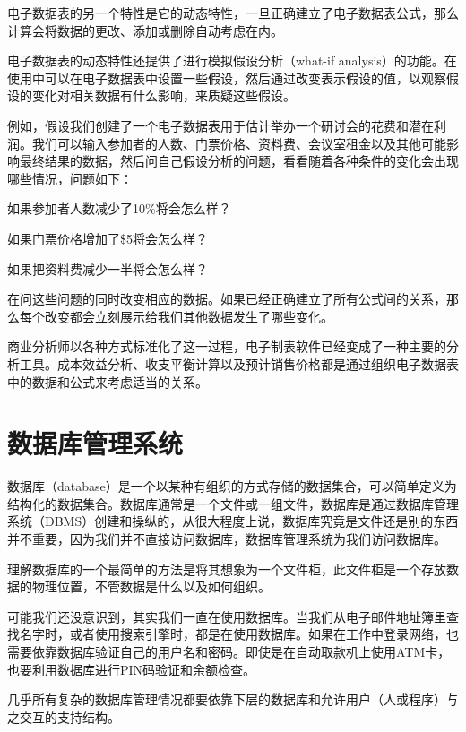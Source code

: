 电子数据表的另一个特性是它的动态特性，一旦正确建立了电子数据表公式，那么计算会将数据的更改、添加或删除自动考虑在内。

电子数据表的动态特性还提供了进行模拟假设分析（what-if analysis）的功能。在使用中可以在电子数据表中设置一些假设，然后通过改变表示假设的值，以观察假设的变化对相关数据有什么影响，来质疑这些假设。

例如，假设我们创建了一个电子数据表用于估计举办一个研讨会的花费和潜在利润。我们可以输入参加者的人数、门票价格、资料费、会议室租金以及其他可能影响最终结果的数据，然后问自己假设分析的问题，看看随着各种条件的变化会出现哪些情况，问题如下：

\begin{compactitem}
\item 如果参加者人数减少了10\%将会怎么样？
\item 如果门票价格增加了\$5将会怎么样？
\item 如果把资料费减少一半将会怎么样？
\end{compactitem}



在问这些问题的同时改变相应的数据。如果已经正确建立了所有公式间的关系，那么每个改变都会立刻展示给我们其他数据发生了哪些变化。

商业分析师以各种方式标准化了这一过程，电子制表软件已经变成了一种主要的分析工具。成本效益分析、收支平衡计算以及预计销售价格都是通过组织电子数据表中的数据和公式来考虑适当的关系。

\chapter{数据库管理系统}


数据库（database）是一个以某种有组织的方式存储的数据集合，可以简单定义为结构化的数据集合。数据库通常是一个文件或一组文件，数据库是通过数据库管理系统（DBMS）创建和操纵的，从很大程度上说，数据库究竟是文件还是别的东西并不重要，因为我们并不直接访问数据库，数据库管理系统为我们访问数据库。

理解数据库的一个最简单的方法是将其想象为一个文件柜，此文件柜是一个存放数据的物理位置，不管数据是什么以及如何组织。

可能我们还没意识到，其实我们一直在使用数据库。当我们从电子邮件地址簿里查找名字时，或者使用搜索引擎时，都是在使用数据库。如果在工作中登录网络，也需要依靠数据库验证自己的用户名和密码。即使是在自动取款机上使用ATM卡，也要利用数据库进行PIN码验证和余额检查。

几乎所有复杂的数据库管理情况都要依靠下层的数据库和允许用户（人或程序）与之交互的支持结构。

